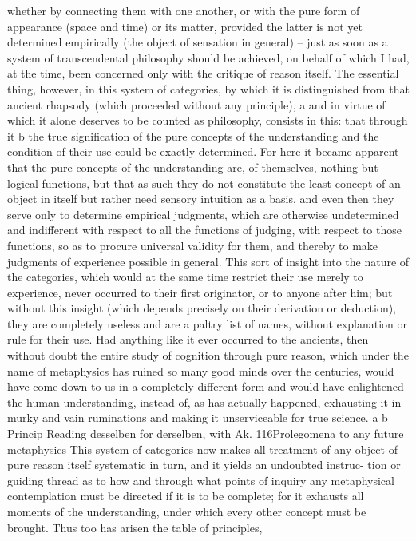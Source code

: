 whether by connecting them with one another, or with the pure form of
appearance (space and time) or its matter, provided the latter is not yet
determined empirically (the object of sensation in general) – just as soon
as a system of transcendental philosophy should be achieved, on behalf of
which I had, at the time, been concerned only with the critique of reason
itself.
The essential thing, however, in this system of categories, by which
it is distinguished from that ancient rhapsody (which proceeded without
any principle), a and in virtue of which it alone deserves to be counted
as philosophy, consists in this: that through it b the true signiﬁcation of
the pure concepts of the understanding and the condition of their use
could be exactly determined. For here it became apparent that the pure
concepts of the understanding are, of themselves, nothing but logical
functions, but that as such they do not constitute the least concept of an
object in itself but rather need sensory intuition as a basis, and even then
they serve only to determine empirical judgments, which are otherwise
undetermined and indifferent with respect to all the functions of judging,
with respect to those functions, so as to procure universal validity for
them, and thereby to make judgments of experience possible in general.
This sort of insight into the nature of the categories, which would
at the same time restrict their use merely to experience, never occurred
to their ﬁrst originator, or to anyone after him; but without this insight
(which depends precisely on their derivation or deduction), they are
completely useless and are a paltry list of names, without explanation
or rule for their use. Had anything like it ever occurred to the ancients,
then without doubt the entire study of cognition through pure reason,
which under the name of metaphysics has ruined so many good minds
over the centuries, would have come down to us in a completely different
form and would have enlightened the human understanding, instead of,
as has actually happened, exhausting it in murky and vain ruminations
and making it unserviceable for true science.
a
b
Princip
Reading desselben for derselben, with Ak.
116Prolegomena to any future metaphysics
This system of categories now makes all treatment of any object of
pure reason itself systematic in turn, and it yields an undoubted instruc-
tion or guiding thread as to how and through what points of inquiry any
metaphysical contemplation must be directed if it is to be complete; for
it exhausts all moments of the understanding, under which every other
concept must be brought. Thus too has arisen the table of principles,
